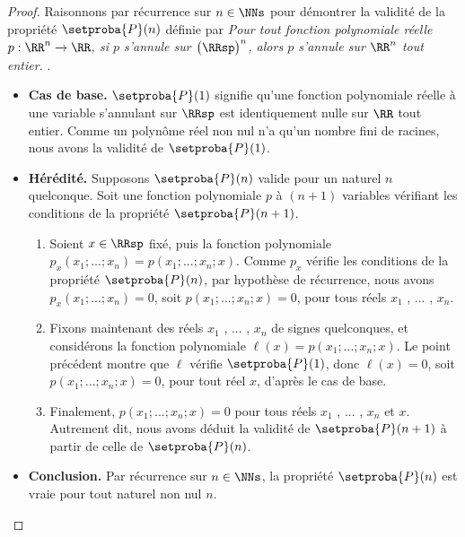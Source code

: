 \begin{proof}
	Raisonnons par récurrence sur $n \in \NNs$ pour démontrer la validité de la propriété $\setproba{P}(n)$ définie par
	\emph{\og 
		Pour tout fonction polynomiale réelle $p: \RR^n \rightarrow \RR$,
		si $p$ s'annule sur $\big( \RRsp \big)^n$,
		alors $p$ s'annule sur $\RR^n$ tout entier. 
	\fg}\kern2pt.
	\begin{itemize}[label=\small\textbullet]
		\item \textbf{Cas de base.}
		$\setproba{P}(1)$ signifie qu'une fonction polynomiale réelle à une variable s'annulant sur $\RRsp$ est identiquement nulle sur $\RR$ tout entier.
		Comme un polynôme réel non nul n'a qu'un nombre fini de racines, nous avons la validité de $\setproba{P}(1)$.


		\item \textbf{Hérédité.}
		Supposons $\setproba{P}(n)$ valide pour un naturel $n$ quelconque.
		Soit une fonction polynomiale $p$ à $(n + 1)$ variables vérifiant les conditions de la propriété $\setproba{P}(n + 1)$.
		\begin{enumerate}
		    \item Soient $x \in \RRsp$ fixé, puis la fonction polynomiale $p_x(x_1 ; ... ; x_n) = p(x_1 ; ... ; x_n ; x)$.
		    Comme $p_x$ vérifie les conditions de la propriété $\setproba{P}(n)$, par hypothèse de récurrence, nous avons
		    $p_x(x_1 ; ... ; x_n) = 0$, soit $p(x_1 ; ... ; x_n ; x) = 0$, pour tous réels $x_1$ , ... , $x_n$.


		    \item Fixons maintenant des réels $x_1$ , ... , $x_n$ de signes quelconques, et considérons la fonction polynomiale $\ell(x) = p(x_1 ; ... ; x_n ; x)$.
		    Le point précédent montre que $\ell$ vérifie $\setproba{P}(1)$, donc $\ell(x) = 0$, soit $p(x_1 ; ... ; x_n ; x) = 0$, pour tout réel $x$, d'après le cas de base.


		    \item Finalement, $p(x_1 ; ... ; x_n ; x) = 0$ pour tous réels $x_1$ , ... , $x_n$ et $x$.
		    Autrement dit, nous avons déduit la validité de $\setproba{P}(n+1)$ à partir de celle de $\setproba{P}(n)$.
		\end{enumerate}
		
		
		\item \textbf{Conclusion.}
		Par récurrence sur $n \in \NNs$, la propriété $\setproba{P}(n)$ est vraie pour tout naturel non nul $n$.
	\end{itemize}

	\null\vspace{-6ex}
\end{proof}


